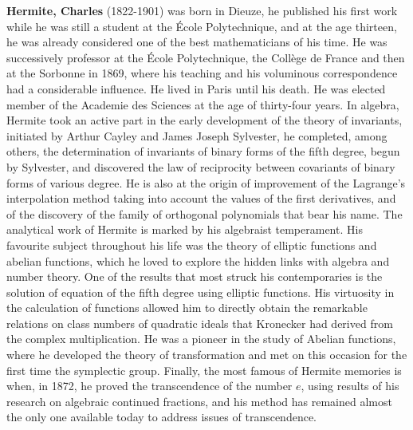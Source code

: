 \textbf{Hermite, Charles} (1822-1901) was born in Dieuze, he published his first work while he was still a student at the École Polytechnique, and at the age thirteen, he was already considered one of the best mathematicians of his time. He was successively professor at the École Polytechnique, the Collège de France and then at the Sorbonne in 1869, where his teaching and his voluminous correspondence had a considerable influence. He lived in Paris until his death. He was elected member of the Academie des Sciences at the age of thirty-four years. In algebra, Hermite took an active part in the early development of the theory of invariants, initiated by Arthur Cayley and James Joseph Sylvester, he completed, among others, the determination of invariants of binary forms of the fifth degree, begun by Sylvester, and discovered the law of reciprocity between covariants of binary forms of various degree. He is also at the origin of improvement of the Lagrange's interpolation method taking into account the values of the first derivatives, and of the discovery of the family of orthogonal polynomials that bear his name. The analytical work of Hermite is marked by his algebraist temperament. His favourite subject throughout his life was the theory of elliptic functions and abelian functions, which he loved to explore the hidden links with algebra and number theory. One of the results that most struck his contemporaries is the solution of equation of the fifth degree using elliptic functions. His virtuosity in the calculation of functions allowed him to directly obtain the remarkable relations on class numbers of quadratic ideals that Kronecker had derived from the complex multiplication. He was a pioneer in the study of Abelian functions, where he developed the theory of transformation and met on this occasion for the first time the symplectic group. Finally, the most famous of Hermite memories is when, in 1872, he proved the transcendence of the number $e$, using results of his research on algebraic continued fractions, and his method has remained almost the only one available today to address issues of transcendence.

